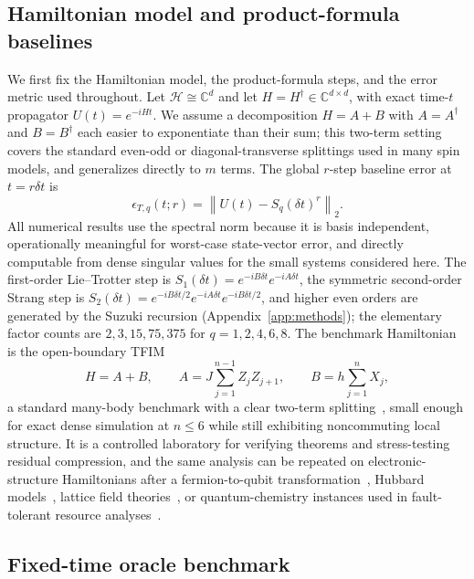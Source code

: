 \documentclass[aps,prresearch,reprint,superscriptaddress,nofootinbib,amsmath,amssymb]{revtex4-2}
\newcommand{\tfim}{TFIM}
\newcommand{\norm}[1]{\left\lVert #1 \right\rVert}
\newcommand{\cH}{\mathcal{H}}
\newcommand{\dt}{\delta t}
\begin{document}
\subsection{Hamiltonian model and product-formula baselines}

We first fix the Hamiltonian model, the product-formula steps, and the error metric used throughout. Let $\cH\cong\mathbb{C}^d$ and let $H=H^\dagger\in\mathbb{C}^{d\times d}$, with exact time-$t$ propagator $U(t)=e^{-iHt}$. We assume a decomposition $H=A+B$ with $A=A^\dagger$ and $B=B^\dagger$ each easier to exponentiate than their sum; this two-term setting covers the standard even-odd or diagonal-transverse splittings used in many spin models, and generalizes directly to $m$ terms. The global $r$-step baseline error at $t=r\dt$ is
\begin{equation}
    \epsilon_{T,q}(t;r)=\norm{U(t)-S_q(\dt)^r}_2.
    \label{eq:baseline-error}
\end{equation}
All numerical results use the spectral norm because it is basis independent, operationally meaningful for worst-case state-vector error, and directly computable from dense singular values for the small systems considered here. The first-order Lie--Trotter step is $S_1(\dt)=e^{-iB\dt}e^{-iA\dt}$, the symmetric second-order Strang step is $S_2(\dt)=e^{-iB\dt/2}e^{-iA\dt}e^{-iB\dt/2}$, and higher even orders are generated by the Suzuki recursion (Appendix~\ref{app:methods}); the elementary factor counts are $2,3,15,75,375$ for $q=1,2,4,6,8$. The benchmark Hamiltonian is the open-boundary \tfim{}
\begin{equation}
    H=A+B,\qquad A=J\sum_{j=1}^{n-1}Z_jZ_{j+1},\qquad B=h\sum_{j=1}^{n}X_j,
    \label{eq:tfim}
\end{equation}
a standard many-body benchmark with a clear two-term splitting~\cite{sachdev2011,cerveralierta2018}, small enough for exact dense simulation at $n\leq6$ while still exhibiting noncommuting local structure. It is a controlled laboratory for verifying theorems and stress-testing residual compression, and the same analysis can be repeated on electronic-structure Hamiltonians after a fermion-to-qubit transformation~\cite{bravyi2002,whitfield2011,seeley2012,verstraete2005}, Hubbard models~\cite{cade2020}, lattice field theories~\cite{jordan2012}, or quantum-chemistry instances used in fault-tolerant resource analyses~\cite{babbush2018,babbush2019}.

\subsection{Fixed-time oracle benchmark}
\end{document}
